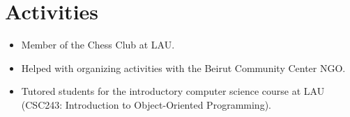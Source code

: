 \documentclass[11pt, a4paper]{article}
\begin{document}
\section{Activities}

\begin{itemize}
  \item Member of the Chess Club at LAU.
  \item Helped with organizing activities with the Beirut Community Center NGO.
  \item Tutored students for the introductory computer science course at LAU
        (CSC243: Introduction to Object-Oriented Programming).
\end{itemize}
\end{document}
